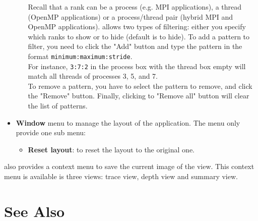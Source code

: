 \documentclass[english]{article}
\begin{document}
\begin{itemize}
\begin{itemize}
Recall that a rank can be a process (e.g. MPI applications), a thread (OpenMP applications) or a process/thread pair (hybrid MPI and OpenMP applications). 
 allows two types of filtering: either you specify which ranks {to show} or {to hide} (default is to hide). 
To add a pattern to filter, you need to click the "Add" button and type the pattern in the format \texttt{minimum:maximum:stride}. \\
For instance, \texttt{3:7:2} in the process box with the thread box empty will match all threads of processes 3, 5, and 7.\\
To remove a pattern, you have to select the pattern to remove, and click the "Remove" button. Finally, clicking to "Remove all" button will clear the list of patterns.
 \end{itemize}
 \item \textbf{Window} menu to manage the layout of the application. The menu only provide one sub menu:
 \begin{itemize}
  \item \textbf{Reset layout}: to reset the layout to the original one.
 \end{itemize}
\end{itemize}

 also provides a context menu to save the current image of the view. 
This context menu is available is three views: trace view, depth view and summary view.






\section{See Also}
\end{document}
